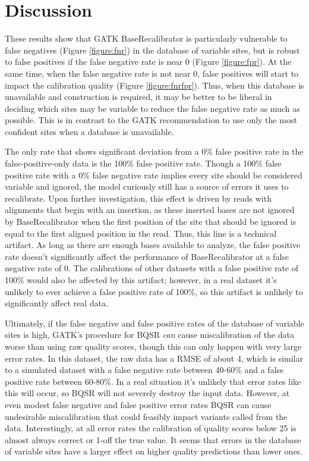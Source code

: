 \section{Discussion}
\label{sec:kbbq_discussion}

These results show that GATK BaseRecalibrator is particularly vulnerable to false negatives (Figure \ref{figure:fnr}) in the database of variable sites, but is robust to false positives if the false negative rate is near 0 (Figure \ref{figure:fpr}). At the same time, when the false negative rate is not near 0, false positives will start to impact the calibration quality (Figure \ref{figure:fnrfpr}). Thus, when this database is unavailable and construction is required, it may be better to be liberal in deciding which sites may be variable to reduce the false negative rate as much as possible. This is in contrast to the GATK recommendation to use only the most confident sites when a database is unavailable.

The only rate that shows significant deviation from a 0\% false positive rate in the false-positive-only data is the 100\% false positive rate. Though a 100\% false positive rate with a 0\% false negative rate implies every site should be considered variable and ignored, the model curiously still has a source of errors it uses to recalibrate. Upon further investigation, this effect is driven by reads with alignments that begin with an insertion, as these inserted bases are not ignored by BaseRecalibrator when the first position of the site that should be ignored is equal to the first aligned position in the read. Thus, this line is a technical artifact. As long as there are enough bases available to analyze, the false positive rate doesn't significantly affect the performance of BaseRecalibrator at a false negative rate of 0. The calibrations of other datasets with a false positive rate of 100\% would also be affected by this artifact; however, in a real dataset it's unlikely to ever achieve a false positive rate of 100\%, so this artifact is unlikely to significantly affect real data.

Ultimately, if the false negative and false positive rates of the database of variable sites is high, GATK's procedure for BQSR \textit{can} cause miscalibration of the data worse than using raw quality scores, though this can only happen with very large error rates. In this dataset, the raw data has a RMSE of about 4, which is similar to a simulated dataset with a false negative rate between 40-60\% and a false positive rate between 60-80\%. In a real situation it's unlikely that error rates like this will occur, so BQSR will not severely destroy the input data. However, at even modest false negative and false positive error rates BQSR can cause undesirable miscalibration that could feasibly impact variants called from the data. Interestingly, at all error rates the calibration of quality scores below 25 is almost always correct or 1-off the true value. It seems that errors in the database of variable sites have a larger effect on higher quality predictions than lower ones.

